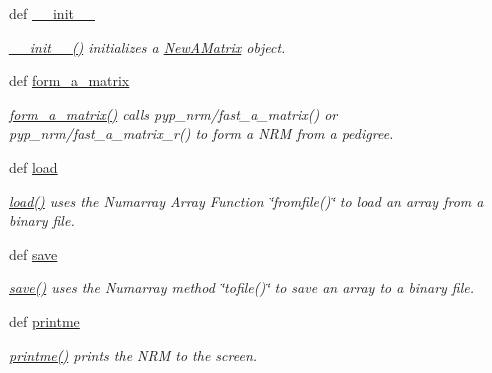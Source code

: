 \begin{DoxyCompactItemize}
\item 
def \hyperlink{classPyPedal_1_1pyp__newclasses_1_1NewAMatrix_a38f78e043e7bee1cac6237a09d912d93}{\_\-\_\-init\_\-\_\-}
\begin{DoxyCompactList}\small\item\em \hyperlink{classPyPedal_1_1pyp__newclasses_1_1NewAMatrix_a38f78e043e7bee1cac6237a09d912d93}{\_\-\_\-init\_\-\_\-()} initializes a \hyperlink{classPyPedal_1_1pyp__newclasses_1_1NewAMatrix}{NewAMatrix} object. \item\end{DoxyCompactList}\item 
def \hyperlink{classPyPedal_1_1pyp__newclasses_1_1NewAMatrix_aab22e9d4b42f4207692435849e15a551}{form\_\-a\_\-matrix}
\begin{DoxyCompactList}\small\item\em \hyperlink{classPyPedal_1_1pyp__newclasses_1_1NewAMatrix_aab22e9d4b42f4207692435849e15a551}{form\_\-a\_\-matrix()} calls pyp\_\-nrm/fast\_\-a\_\-matrix() or pyp\_\-nrm/fast\_\-a\_\-matrix\_\-r() to form a NRM from a pedigree. \item\end{DoxyCompactList}\item 
def \hyperlink{classPyPedal_1_1pyp__newclasses_1_1NewAMatrix_a1d5ee9920957680eb210fe4b1b81adb3}{load}
\begin{DoxyCompactList}\small\item\em \hyperlink{classPyPedal_1_1pyp__newclasses_1_1NewAMatrix_a1d5ee9920957680eb210fe4b1b81adb3}{load()} uses the Numarray Array Function \char`\"{}fromfile()\char`\"{} to load an array from a binary file. \item\end{DoxyCompactList}\item 
def \hyperlink{classPyPedal_1_1pyp__newclasses_1_1NewAMatrix_ac2ee373f5e250c7ae637dc983f1b1651}{save}
\begin{DoxyCompactList}\small\item\em \hyperlink{classPyPedal_1_1pyp__newclasses_1_1NewAMatrix_ac2ee373f5e250c7ae637dc983f1b1651}{save()} uses the Numarray method \char`\"{}tofile()\char`\"{} to save an array to a binary file. \item\end{DoxyCompactList}\item 
def \hyperlink{classPyPedal_1_1pyp__newclasses_1_1NewAMatrix_a65c238459dd58cb32ec19cb7c93164ba}{printme}
\begin{DoxyCompactList}\small\item\em \hyperlink{classPyPedal_1_1pyp__newclasses_1_1NewAMatrix_a65c238459dd58cb32ec19cb7c93164ba}{printme()} prints the NRM to the screen. \item\end{DoxyCompactList}\end{DoxyCompactItemize}
